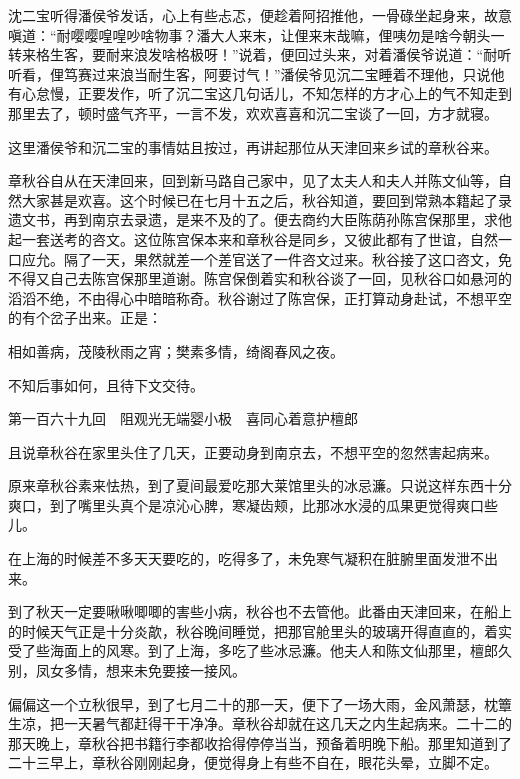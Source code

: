 \documentclass[12pt,UTF8]{ctexbook}
\begin{document}
{{{沈二宝听得潘侯爷发话，心上有些忐忑，便趁着阿招推他，一骨碌坐起身来，故意嗔道：“耐嘤嘤喤喤吵啥物事？潘大人来末，让俚来末哉嘛，俚咦勿是啥今朝头一转来格生客，要耐来浪发啥格极呀！”说着，便回过头来，对着潘侯爷说道：“耐听听看，俚笃赛过来浪当耐生客，阿要讨气！”潘侯爷见沉二宝睡着不理他，只说他有心怠慢，正要发作，听了沉二宝这几句话儿，不知怎样的方才心上的气不知走到那里去了，顿时盛气齐平，一言不发，欢欢喜喜和沉二宝谈了一回，方才就寝。

这里潘侯爷和沉二宝的事情姑且按过，再讲起那位从天津回来乡试的章秋谷来。

章秋谷自从在天津回来，回到新马路自己家中，见了太夫人和夫人并陈文仙等，自然大家甚是欢喜。这个时候已在七月十五之后，秋谷知道，要回到常熟本籍起了录遗文书，再到南京去录遗，是来不及的了。便去商约大臣陈荫孙陈宫保那里，求他起一套送考的咨文。这位陈宫保本来和章秋谷是同乡，又彼此都有了世谊，自然一口应允。隔了一天，果然就差一个差官送了一件咨文过来。秋谷接了这口咨文，免不得又自己去陈宫保那里道谢。陈宫保倒着实和秋谷谈了一回，见秋谷口如悬河的滔滔不绝，不由得心中暗暗称奇。秋谷谢过了陈宫保，正打算动身赴试，不想平空的有个岔子出来。正是：

相如善病，茂陵秋雨之宵；樊素多情，绮阁春风之夜。

不知后事如何，且待下文交待。





第一百六十九回　阻观光无端婴小极　喜同心着意护檀郎





且说章秋谷在家里头住了几天，正要动身到南京去，不想平空的忽然害起病来。

原来章秋谷素来怯热，到了夏间最爱吃那大莱馆里头的冰忌濂。只说这样东西十分爽口，到了嘴里头真个是凉沁心脾，寒凝齿颊，比那冰水浸的瓜果更觉得爽口些儿。

在上海的时候差不多天天要吃的，吃得多了，未免寒气凝积在脏腑里面发泄不出来。

到了秋天一定要啾啾唧唧的害些小病，秋谷也不去管他。此番由天津回来，在船上的时候天气正是十分炎歊，秋谷晚间睡觉，把那官舱里头的玻璃开得直直的，着实受了些海面上的风寒。到了上海，多吃了些冰忌濂。他夫人和陈文仙那里，檀郎久别，凤女多情，想来未免要接一接风。

偏偏这一个立秋很早，到了七月二十的那一天，便下了一场大雨，金风萧瑟，枕簟生凉，把一天暑气都赶得干干净净。章秋谷却就在这几天之内生起病来。二十二的那天晚上，章秋谷把书籍行李都收拾得停停当当，预备着明晚下船。那里知道到了二十三早上，章秋谷刚刚起身，便觉得身上有些不自在，眼花头晕，立脚不定。

}}}
\end{document}
